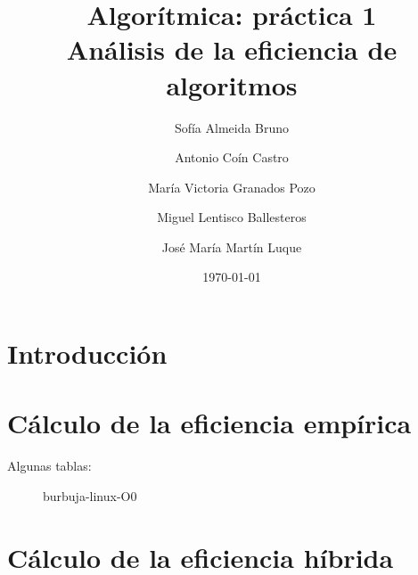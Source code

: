 \documentclass[11pt]{article}
\title{Algorítmica: práctica 1 \\ \large Análisis de la eficiencia de algoritmos}
\author{Sofía Almeida Bruno \and Antonio Coín Castro \and María Victoria Granados Pozo \and Miguel Lentisco Ballesteros \and José María Martín Luque}
\date{\today}
\begin{document}
\maketitle

\newpage

\section*{Introducción}

\section*{Cálculo de la eficiencia empírica}


	\begin{center}
		
	\end{center}



	\begin{center}
		
	\end{center}



	\begin{center}
		
	\end{center}



	\begin{center}
		
	\end{center}



	\begin{center}
		
	\end{center}



	\begin{center}
		
	\end{center}



	\begin{center}
		
	\end{center}


	\begin{center}
		
	\end{center}
	
	\newpage

Algunas tablas:

\begin{center}
	\begin{figure*}[h]
		\centering
		\caption*{burbuja-linux-O0}
		
	\end{figure*}
	

\end{center}


	

\section*{Cálculo de la eficiencia híbrida}
\end{document}
